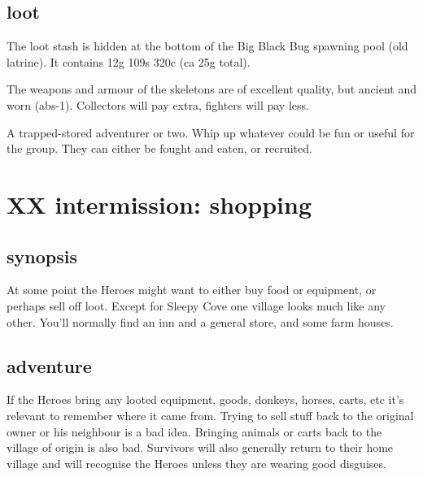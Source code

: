 \subsection*{loot}

The loot stash is hidden at the bottom of the Big Black Bug spawning pool (old latrine). It contains 12g 109s 320c (ca 25g total).

The weapons and armour of the skeletons are of excellent quality, but ancient and worn (abs-1). Collectors will pay extra, fighters will pay less.

A trapped-stored adventurer or two. Whip up whatever could be fun or useful for the group. They can either be fought and eaten, or recruited.











\clearpage
\section*{XX intermission: shopping}


\subsection*{synopsis}

At some point the Heroes might want to either buy food or equipment, or perhaps sell off loot. Except for Sleepy Cove one village looks much like any other. You'll normally find an inn and a general store, and some farm houses.


\subsection*{adventure}

If the Heroes bring any looted equipment, goods, donkeys, horses, carts, etc it's relevant to remember where it came from. Trying to sell stuff back to the original owner or his neighbour is a bad idea. Bringing animals or carts back to the village of origin is also bad. Survivors will also generally return to their home village and will recognise the Heroes unless they are wearing good disguises.

